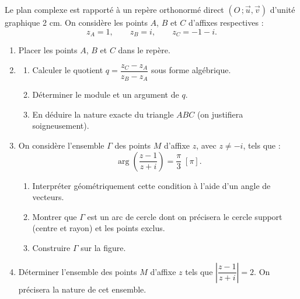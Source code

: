 \documentclass[11pt]{article}
\begin{document}
\begin{exercice}
Le plan complexe est rapporté à un repère orthonormé direct $(O\,;\vec{u},\vec{v})$ d'unité graphique 2 cm. On considère les points $A$, $B$ et $C$ d'affixes respectives :
\[ z_A = 1, \qquad z_B = i, \qquad z_C = -1 - i. \]
\begin{enumerate}
\item Placer les points $A$, $B$ et $C$ dans le repère.
\item \begin{enumerate}
\item Calculer le quotient $q = \dfrac{z_C - z_A}{z_B - z_A}$ sous forme algébrique.
\item Déterminer le module et un argument de $q$.
\item En déduire la nature exacte du triangle $ABC$ (on justifiera soigneusement).
\end{enumerate}
\item On considère l'ensemble $\Gamma$ des points $M$ d'affixe $z$, avec $z \neq -i$, tels que :
\[ \arg\left(\frac{z - 1}{z + i}\right) = \frac{\pi}{3} \;[\pi]. \]
\begin{enumerate}
\item Interpréter géométriquement cette condition à l'aide d'un angle de vecteurs.
\item Montrer que $\Gamma$ est un arc de cercle dont on précisera le cercle support (centre et rayon) et les points exclus.
\item Construire $\Gamma$ sur la figure.
\end{enumerate}
\item Déterminer l'ensemble des points $M$ d'affixe $z$ tels que $\left|\dfrac{z - 1}{z + i}\right| = 2$. On précisera la nature de cet ensemble.
\end{enumerate}
\end{exercice}
\end{document}
